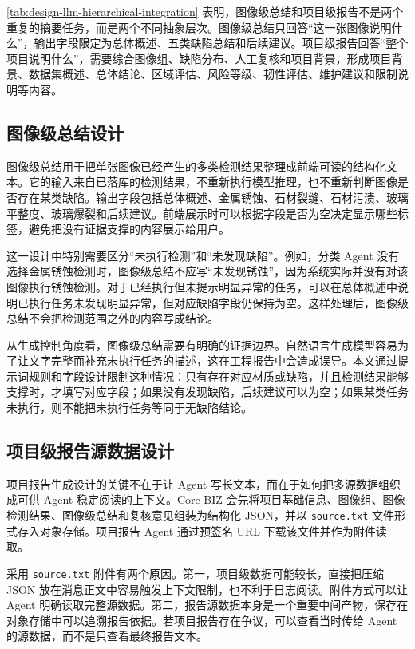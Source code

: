 \cref{tab:design-llm-hierarchical-integration} 表明，图像级总结和项目级报告不是两个重复的摘要任务，而是两个不同抽象层次。图像级总结只回答“这一张图像说明什么”，输出字段限定为总体概述、五类缺陷总结和后续建议。项目级报告回答“整个项目说明什么”，需要综合图像组、缺陷分布、人工复核和项目背景，形成项目背景、数据集概述、总体结论、区域评估、风险等级、韧性评估、维护建议和限制说明等内容。

\subsection{图像级总结设计}
\label{subsec:design-image-level-summary}

图像级总结用于把单张图像已经产生的多类检测结果整理成前端可读的结构化文本。它的输入来自已落库的检测结果，不重新执行模型推理，也不重新判断图像是否存在某类缺陷。输出字段包括总体概述、金属锈蚀、石材裂缝、石材污渍、玻璃平整度、玻璃爆裂和后续建议。前端展示时可以根据字段是否为空决定显示哪些标签，避免把没有证据支撑的内容展示给用户。

这一设计中特别需要区分“未执行检测”和“未发现缺陷”。例如，分类 Agent 没有选择金属锈蚀检测时，图像级总结不应写“未发现锈蚀”，因为系统实际并没有对该图像执行锈蚀检测。对于已经执行但未提示明显异常的任务，可以在总体概述中说明已执行任务未发现明显异常，但对应缺陷字段仍保持为空。这样处理后，图像级总结不会把检测范围之外的内容写成结论。

从生成控制角度看，图像级总结需要有明确的证据边界。自然语言生成模型容易为了让文字完整而补充未执行任务的描述，这在工程报告中会造成误导。本文通过提示词规则和字段设计限制这种情况：只有存在对应材质或缺陷，并且检测结果能够支撑时，才填写对应字段；如果没有发现缺陷，后续建议可以为空；如果某类任务未执行，则不能把未执行任务等同于无缺陷结论。

\subsection{项目级报告源数据设计}
\label{subsec:design-project-report-source-data}

项目报告生成设计的关键不在于让 Agent 写长文本，而在于如何把多源数据组织成可供 Agent 稳定阅读的上下文。Core BIZ 会先将项目基础信息、图像组、图像检测结果、图像级总结和复核意见组装为结构化 JSON，并以 \texttt{source.txt} 文件形式存入对象存储。项目报告 Agent 通过预签名 URL 下载该文件并作为附件读取。

采用 \texttt{source.txt} 附件有两个原因。第一，项目级数据可能较长，直接把压缩 JSON 放在消息正文中容易触发上下文限制，也不利于日志阅读。附件方式可以让 Agent 明确读取完整源数据。第二，报告源数据本身是一个重要中间产物，保存在对象存储中可以追溯报告依据。若项目报告存在争议，可以查看当时传给 Agent 的源数据，而不是只查看最终报告文本。

